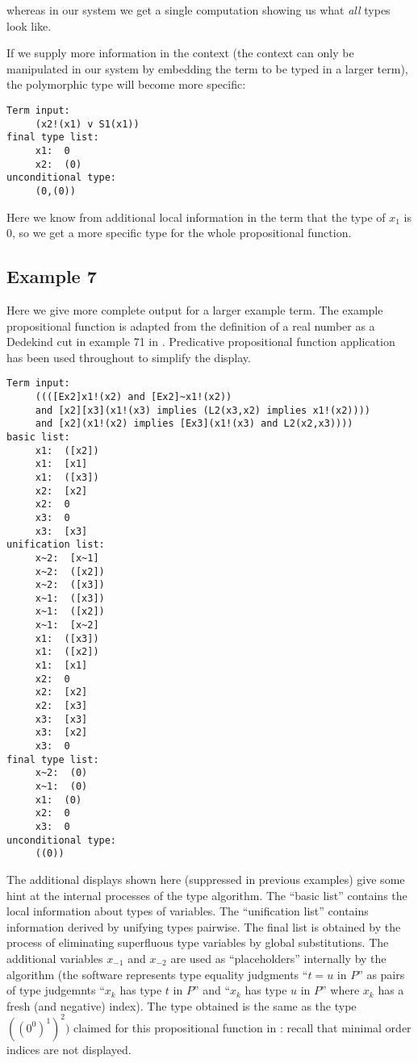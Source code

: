 \documentclass{article}
\begin{document}
\noindent whereas in our system we get a single computation showing us what
{\em all\/} types look like.

     If we supply more information in the context (the context can
only be manipulated in our system by embedding the term to be typed in
a larger term), the polymorphic type will become more specific:

\begin{verbatim}
Term input:
     (x2!(x1) v S1(x1))
final type list:
     x1:  0
     x2:  (0)
unconditional type:
     (0,(0))
\end{verbatim}

Here we know from additional local information in the term that the
type of $x_1$ is 0, so we get a more specific type for the whole
propositional function.
\subsection{Example 7}
Here we give more complete output for a larger example term.  The
example propositional function is adapted from the definition of a
real number as a Dedekind cut in example 71 in \cite{types40}.
Predicative propositional function application has been used
throughout to simplify the display.

\begin{verbatim}
Term input:
     ((([Ex2]x1!(x2) and [Ex2]~x1!(x2)) 
     and [x2][x3](x1!(x3) implies (L2(x3,x2) implies x1!(x2)))) 
     and [x2](x1!(x2) implies [Ex3](x1!(x3) and L2(x2,x3))))
basic list:
     x1:  ([x2])
     x1:  [x1]
     x1:  ([x3])
     x2:  [x2]
     x2:  0
     x3:  0
     x3:  [x3]
unification list:
     x~2:  [x~1]
     x~2:  ([x2])
     x~2:  ([x3])
     x~1:  ([x3])
     x~1:  ([x2])
     x~1:  [x~2]
     x1:  ([x3])
     x1:  ([x2])
     x1:  [x1]
     x2:  0
     x2:  [x2]
     x2:  [x3]
     x3:  [x3]
     x3:  [x2]
     x3:  0
final type list:
     x~2:  (0)
     x~1:  (0)
     x1:  (0)
     x2:  0
     x3:  0
unconditional type:
     ((0))
\end{verbatim}

The additional displays shown here (suppressed in previous examples)
give some hint at the internal processes of the type algorithm.  The
``basic list'' contains the local information about types of
variables.  The ``unification list'' contains information derived by
unifying types pairwise.  The final list is obtained by the process of
eliminating superfluous type variables by global substitutions.  The
additional variables $x_{-1}$ and $x_{-2}$ are used as
``placeholders'' internally by the algorithm (the software represents
type equality judgments ``$t = u$ in $P$'' as pairs of type judgemnts
``$x_k$ has type $t$ in $P$'' and ``$x_k$ has type $u$ in $P$'' where
$x_k$ has a fresh (and negative) index).  The type obtained is the
same as the type $((0^0)^1)^2)$ claimed for this propositional
function in \cite{types40}: recall that minimal order indices are not
displayed.
\end{document}
